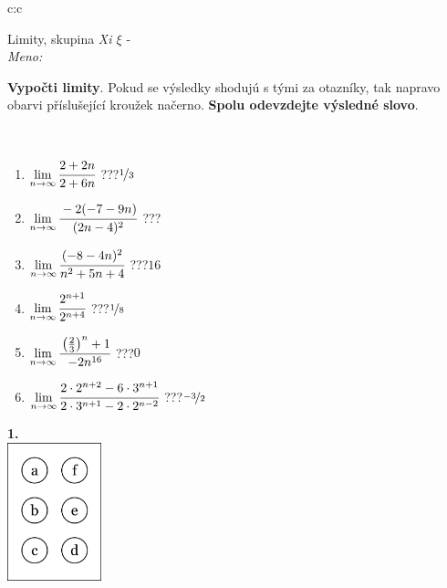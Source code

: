 \documentclass[10pt]{report}
\begin{document}
\begin{tabular}{c:c}
\begin{minipage}[c][104.5mm][t]{0.5\linewidth}
\begin{center}
\vspace{7mm}
{\huge Limity, skupina \textit{Xi $\xi$} -}\\[5mm]
\textit{Meno:}\phantom{xxxxxxxxxxxxxxxxxxxxxxxxxxxxxxxxxxxxxxxxxxxxxxxxxxxxxxxxxxxxxxxxx}\\[5mm]
\begin{minipage}{0.95\linewidth}
\begin{center}
\textbf{Vypočti limity}. Pokud se výsledky shodujú s tými za otazníky, tak napravo\\obarvi příslušející kroužek načerno. \textbf{Spolu odevzdejte výsledné slovo}.
\end{center}
\end{minipage}
\\[1mm]
\begin{minipage}{0.79\linewidth}
\begin{center}
\begin{varwidth}{\linewidth}
\begin{enumerate}
\normalsize
\item $\lim\limits_{n\to\infty}\cfrac{2+2n}{2+6n}$\quad \dotfill\; ???\;\dotfill \quad $\nicefrac{1}{3}$
\item $\lim\limits_{n\to\infty}\cfrac{-2(-7-9n)}{(2n-4)^2}$\quad \dotfill\; ???\;\dotfill {}
\item $\lim\limits_{n\to\infty}\cfrac{(-8-4n)^2}{n^2+5n+4}$\quad \dotfill\; ???\;\dotfill \quad $16$
\item $\lim\limits_{n\to\infty}\cfrac{2^{n+1}}{2^{n+4}}$\quad \dotfill\; ???\;\dotfill \quad $\nicefrac{1}{8}$
\item $\lim\limits_{n\to\infty}\cfrac{\left(\frac{2}{3}\right)^n +1}{-2n^{16}}$\quad \dotfill\; ???\;\dotfill \quad $0$
\item $\lim\limits_{n\to\infty}\cfrac{2\cdot 2^{n+2}-6\cdot 3^{n+1}}{2\cdot 3^{n+1}-2\cdot 2^{n-2}}$\quad \dotfill\; ???\;\dotfill \quad $\nicefrac{-3}{2}$
\end{enumerate}
\end{varwidth}
\end{center}
\end{minipage}
\begin{minipage}{0.20\linewidth}
\begin{center}
{\Huge\bfseries 1.} \\[2mm]
\includegraphics[height=40mm]{../images/braille.png}

\end{center}
\end{minipage}
\end{center}
\end{minipage}
\end{tabular}
\end{document}
